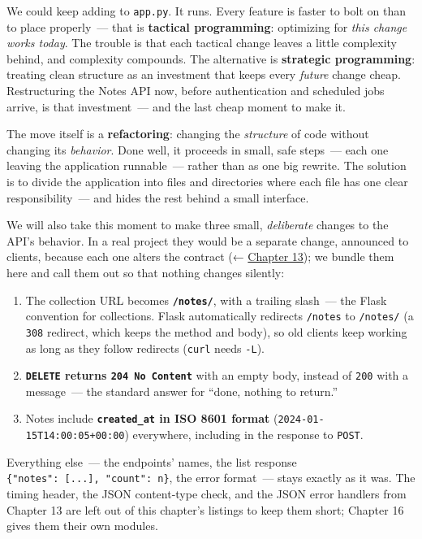 We could keep adding to \texttt{app.py}. It runs. Every feature is faster to bolt on than to place properly~--- that is \textbf{tactical programming}: optimizing for \emph{this change works today}. The trouble is that each tactical change leaves a little complexity behind, and complexity compounds. The alternative is \textbf{strategic programming}: treating clean structure as an investment that keeps every \emph{future} change cheap. Restructuring the Notes API now, before authentication and scheduled jobs arrive, is that investment~--- and the last cheap moment to make it.

The move itself is a \textbf{refactoring}: changing the \emph{structure} of code without changing its \emph{behavior}. Done well, it proceeds in small, safe steps~--- each one leaving the application runnable~--- rather than as one big rewrite. The solution is to divide the application into files and directories where each file has one clear responsibility~--- and hides the rest behind a small interface.

We will also take this moment to make three small, \emph{deliberate} changes to the API's behavior. In a real project they would be a separate change, announced to clients, because each one alters the contract (← \hyperref[ch:13-configuration-externalization]{Chapter 13}); we bundle them here and call them out so that nothing changes silently:

\begin{enumerate}
\def\labelenumi{\arabic{enumi}.}
\tightlist
\item
  The collection URL becomes \textbf{\texttt{/notes/}}, with a trailing slash~--- the Flask convention for collections. Flask automatically redirects \texttt{/notes} to \texttt{/notes/} (a \texttt{308} redirect, which keeps the method and body), so old clients keep working as long as they follow redirects (\texttt{curl} needs \texttt{-L}).
\item
  \textbf{\texttt{DELETE} returns \texttt{204\ No\ Content}} with an empty body, instead of \texttt{200} with a message~--- the standard answer for ``done, nothing to return.''
\item
  Notes include \textbf{\texttt{created\_at} in ISO 8601 format} (\texttt{2024-}\allowbreak{}\texttt{01-}\allowbreak{}\texttt{15T14:}\allowbreak{}\texttt{00:}\allowbreak{}\texttt{05+00:}\allowbreak{}\texttt{00}) everywhere, including in the response to \texttt{POST}.
\end{enumerate}

\noindent{}Everything else~--- the endpoints' names, the list response \texttt{\{"notes":}\allowbreak{}\texttt{\ {[}.}\allowbreak{}\texttt{.}\allowbreak{}\texttt{.}\allowbreak{}\texttt{{]},}\allowbreak{}\texttt{\ "count":}\allowbreak{}\texttt{\ n\}}, the error format~--- stays exactly as it was. The timing header, the JSON content-type check, and the JSON error handlers from Chapter 13 are left out of this chapter's listings to keep them short; Chapter 16 gives them their own modules.


